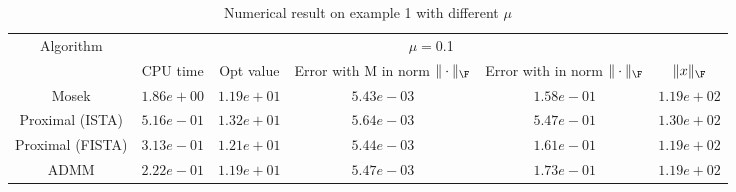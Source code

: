 \begin{table}
\centering
\begin{tabular}{|c|c|c|c|c|c|}

\hline
\multirow{2}{*}{ Algorithm} &\multicolumn{5}{c|}{$\mu=$0.1}\\\cline{2-6}
 &CPU time &Opt value &Error with M in norm $\|\cdot\|_\F$ &Error with in norm $\|\cdot\|_\F$ &$\|x\|_\F$\\\hline
Mosek & $1.86e+00$ & $1.19e+01$ & $5.43e-03$ & $1.58e-01$ & $1.19e+02$\\\hline
Proximal (ISTA) & $5.16e-01$ & $1.32e+01$ & $5.64e-03$ & $5.47e-01$ & $1.30e+02$\\\hline
Proximal (FISTA) & $3.13e-01$ & $1.21e+01$ & $5.44e-03$ & $1.61e-01$ & $1.19e+02$\\\hline
ADMM & $2.22e-01$ & $1.19e+01$ & $5.47e-03$ & $1.73e-01$ & $1.19e+02$\\\hline
\end{tabular}
\caption{Numerical result on example 1 with different $\mu$\label{example1}}
\end{table}
